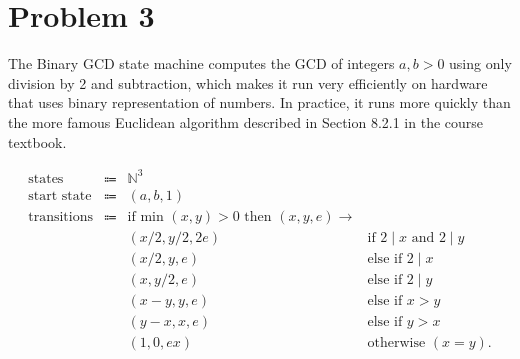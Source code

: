 \documentclass[14pt]{extarticle}
\begin{document}
\section{Problem 3}
The Binary GCD state machine computes the GCD of integers $a, b > 0$ using only division by 2 and subtraction, which makes it run very efficiently on hardware that uses binary representation of numbers. In practice, it runs more quickly than the more famous Euclidean algorithm described in Section 8.2.1 in the course textbook.

$$
\begin{array}{cccc}
\text{states} & \Coloneqq & \mathbb{N}^3 & \\
\text{start state} & \Coloneqq & (a,b,1) & \\
\text{transitions} & \Coloneqq & \text{if min }(x,y) > 0 \text{ then } (x,y,e) \to & \\
 & & (x/2, y/2, 2e) & \text{if } 2 \mid x \text{ and } 2 \mid y \\
 & & (x/2, y, e) & \text{else if } 2 \mid x \\
 & & (x, y/2, e) & \text{else if } 2 \mid y \\
 & & (x-y, y, e) & \text{else if } x > y \\
 & & (y-x, x, e) & \text{else if } y > x \\
 & & (1, 0, ex) & \text{otherwise } (x = y).
\end{array}
$$
\end{document}
